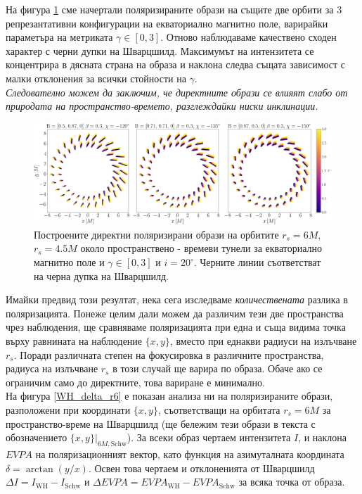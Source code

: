 На фигура \ref{WH_pol_eq_field} сме начертали поляризираните образи на същите две орбити за 3 репрезантативни конфигурации на екваториално магнитно поле, варирайки параметъра на метриката $\gamma \in[0,3]$. Отново наблюдаваме качествено сходен характер с черни дупки на Шварцшилд. Максимумът на интензитета се концентрира в дясната страна на образа и наклона следва същата зависимост с малки отклонения за всички стойности на $\gamma$. \\

\emph{Следователно можем да заключим, че директните образи се влияят слабо от природата на пространство-времето, разглеждайки ниски инклинации.}

\begin{figure}[!htb]
	\centering
	\includegraphics[scale = 0.2]{WH_alpha_Eq_Field.png}
	\caption[Поляризирани директни образи около пространствено - времеви тунели за екваториално магнитно поле.]{\small Построените директни поляризирани образи на орбитите $r_s = 6M$, $r_s = 4.5M$ около пространствено - времеви тунели за екваториално магнитно поле и $\gamma \in[0,3]$ и $i = 20^\circ$. Черните линии съответстват на черна дупка на Шварцшилд.} 
	\label{WH_pol_eq_field}
\end{figure}

\newpage

Имайки предвид този резултат, нека сега изследваме \emph{количествената} разлика в поляризацията. Понеже целим дали можем да различим тези две пространства чрез наблюдения, ще сравняваме поляризацията при една и съща видима точка върху равнината на наблюдение $\{x,y\}$, вместо при еднакви радиуси на излъчване $r_s$. Поради различната степен на фокусировка в различните пространства, радиуса на излъчване $r_s$ в този случай ще варира по образа. Обаче ако се ограничим само до директните, това вариране е минимално.\\

На фигура \ref{WH_delta_r6} е показан анализа ни на поляризираните образи, разположени при координати $\{x,y\}$, съответстващи на орбитата $r_s = 6M$ за пространство-време на Шварцшилд (ще бележим тези образи в текста с обозначението $\{x,y\}\vert_{6M, \text{Schw}}$). За всеки образ чертаем интензитета $I$, и наклона $EVPA$ на поляризационният вектор, като функция на азимуталната координата $\delta = \arctan(y / x)$. Освен това чертаем и отклоненията от Шварцшилд $\Delta I = I_{\text{WH}} - I_{\text{Schw}}$ и $\Delta EVPA = EVPA_\text{WH} - EVPA_\text{Schw}$ за всяка точка от образа.


